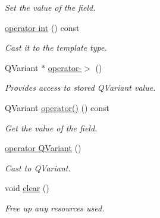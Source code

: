 \begin{DoxyCompactItemize}
\begin{DoxyCompactList}\small\item\em Set the value of the field. \item\end{DoxyCompactList}\item 
\hypertarget{classDQField_a619e96cbcecea1545b9ff9c70f08a4a9}{
\hyperlink{classDQField_a619e96cbcecea1545b9ff9c70f08a4a9}{operator int} () const}
\label{classDQField_a619e96cbcecea1545b9ff9c70f08a4a9}

\begin{DoxyCompactList}\small\item\em Cast it to the template type. \item\end{DoxyCompactList}\item 
\hypertarget{classDQBaseField_a4525fb1805a119e1f8a02a3097f8e475}{
QVariant $\ast$ \hyperlink{classDQBaseField_a4525fb1805a119e1f8a02a3097f8e475}{operator-\/$>$} ()}
\label{classDQBaseField_a4525fb1805a119e1f8a02a3097f8e475}

\begin{DoxyCompactList}\small\item\em Provides access to stored QVariant value. \item\end{DoxyCompactList}\item 
\hypertarget{classDQBaseField_a34625c95d2baf6794ab15a2c9adbe59e}{
QVariant \hyperlink{classDQBaseField_a34625c95d2baf6794ab15a2c9adbe59e}{operator()} () const }
\label{classDQBaseField_a34625c95d2baf6794ab15a2c9adbe59e}

\begin{DoxyCompactList}\small\item\em Get the value of the field. \item\end{DoxyCompactList}\item 
\hypertarget{classDQBaseField_a6cb1f4cb9501b27818453ec37570580f}{
\hyperlink{classDQBaseField_a6cb1f4cb9501b27818453ec37570580f}{operator QVariant} ()}
\label{classDQBaseField_a6cb1f4cb9501b27818453ec37570580f}

\begin{DoxyCompactList}\small\item\em Cast to QVariant. \item\end{DoxyCompactList}\item 
\hypertarget{classDQBaseField_a0c9970518c790bb356007470f0a6b8c1}{
void \hyperlink{classDQBaseField_a0c9970518c790bb356007470f0a6b8c1}{clear} ()}
\label{classDQBaseField_a0c9970518c790bb356007470f0a6b8c1}

\begin{DoxyCompactList}\small\item\em Free up any resources used. \item\end{DoxyCompactList}\end{DoxyCompactItemize}
